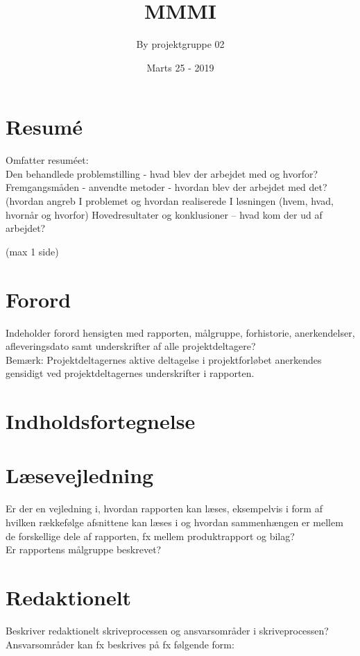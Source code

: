 \documentclass[12pt]{article}
\title{MMMI}
\author{By projektgruppe 02 }
\date{Marts 25 - 2019}
\begin{document}
\begin{titlepage}
\clearpage
\maketitle
\thispagestyle{empty}
\end{titlepage}


\section{Resumé}
Omfatter resuméet:\\
Den behandlede problemstilling - hvad blev der arbejdet med og hvorfor?\\
Fremgangsmåden - anvendte metoder - hvordan blev der arbejdet med det? \\(hvordan angreb I problemet og hvordan realiserede I løsningen (hvem, hvad, hvornår og hvorfor)
Hovedresultater og konklusioner  – hvad kom der ud af arbejdet?\\
\begin{Large}
(max  1 side)
\end{Large}
\section{Forord}
Indeholder forord hensigten med rapporten, målgruppe, forhistorie, anerkendelser, afleveringsdato samt underskrifter af alle projektdeltagere?\\
Bemærk: Projektdeltagernes aktive deltagelse i projektforløbet anerkendes gensidigt ved projektdeltagernes underskrifter i rapporten. 
\section{Indholdsfortegnelse}
\tableofcontents
\pagebreak
\section{Læsevejledning}
Er der en vejledning i, hvordan rapporten kan læses, eksempelvis i form af hvilken rækkefølge afsnittene kan læses i og hvordan sammenhængen er mellem de forskellige dele af rapporten, fx mellem produktrapport og bilag?\\
Er rapportens målgruppe beskrevet?
\section{Redaktionelt}
Beskriver redaktionelt skriveprocessen og ansvarsområder i skriveprocessen?\\
Ansvarsområder kan fx beskrives på fx følgende form:
\end{document}
